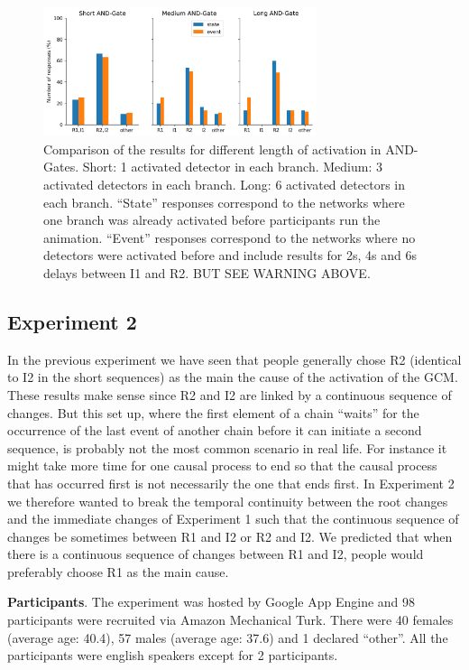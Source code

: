 \documentclass[10pt,letterpaper]{article}
\begin{document}
\begin{figure}[ht]
\begin{center}
\includegraphics[width=8cm]{results_E1}
\end{center}
\caption{Comparison of the results for different length of activation in AND-Gates. Short: 1 activated detector in each branch. Medium: 3 activated detectors in each branch. Long: 6 activated detectors in each branch. ``State'' responses correspond to the networks where one branch was already activated before participants run the animation. ``Event'' responses correspond to the networks where no detectors were activated before and include results for 2s, 4s and 6s delays between I1 and R2. BUT SEE WARNING ABOVE.} 
\label{fig:2}
\end{figure}

\subsection{Experiment 2}

In the previous experiment we have seen that people generally chose R2 (identical to I2 in the short sequences) as the main the cause of the activation of the GCM. These results make sense since R2 and I2 are linked by a continuous sequence of changes. But this set up, where the first element of a chain ``waits'' for the occurrence of the last event of another chain before it can initiate a second sequence, is probably not the most common scenario in real life. For instance it might take more time for one causal process to end so that the causal process that has occurred first is not necessarily the one that ends first. In Experiment 2 we therefore wanted to break the temporal continuity between the root changes and the immediate changes of Experiment 1 such that the continuous sequence of changes be sometimes between R1 and I2 or R2 and I2. We predicted that when there is a continuous sequence of changes between R1 and I2, people would preferably choose R1 as the main cause.

\textbf{Participants}. The experiment was hosted by Google App Engine and 98 participants were recruited via Amazon Mechanical Turk. There were 40 females (average age: 40.4), 57 males (average age: 37.6) and 1 declared ``other''. All the participants were english speakers except for 2 participants.
\end{document}

